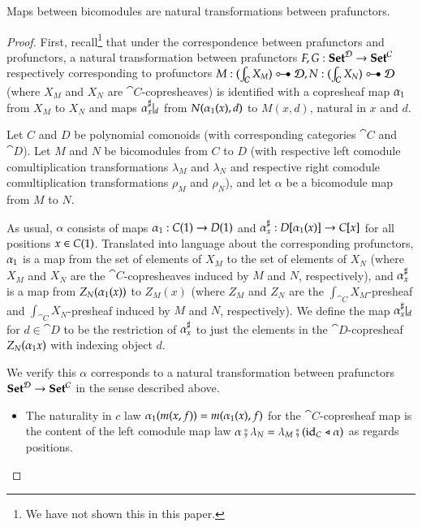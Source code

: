 \documentclass{amsart}
\begin{document}
\begin{prop}
  Maps between bicomodules are natural transformations between prafunctors.
\end{prop}
\begin{proof}
  First, recall\footnote{We have not shown this in this paper.} that
  under the correspondence between prafunctors and profunctors, a
  natural transformation between prafunctors
  $F, G: {\normalfont\mathbf{Set}}^{\mathcal{D}} \to {\normalfont\mathbf{Set}}^{\mathcal{C}}$ respectively corresponding
  to profunctors
  $M : (\int_{\cat{C}} X_M) \prof \cat{D}, N : (\int_{\cat{C}} X_N)
  \prof \cat{D}$ (where $X_M$ and $X_N$ are $\cat{C}$-copresheaves) is
  identified with a copresheaf map ${\alpha}_1$ from $X_M$ to
  $X_N$ and maps ${\alpha}^\sharp_{x}|_{d}$ from
  $N({\alpha}_1(x), d)$ to $M(x, d)$, natural in $x$ and $d$.

  Let $C$ and $D$ be polynomial comonoids (with corresponding
  categories $\cat{C}$ and $\cat{D}$). Let $M$ and $N$ be bicomodules
  from $C$ to $D$ (with respective left comodule comultiplication
  transformations $\lambda_M$ and $\lambda_N$ and respective right
  comodule comultiplication transformations $\rho_M$ and $\rho_N$),
  and let $\alpha$ be a bicomodule map from $M$ to $N$.

  As usual, $\alpha$ consists of maps
  ${\alpha}_1: C(1) \to D(1)$ and
  ${\alpha}^\sharp_{x}: D[{\alpha}_1(x)] \to C[x]$
  for all positions $x \in C(1)$. Translated into language about
  the corresponding profunctors, ${\alpha}_1$ is a map from the
  set of elements of $X_M$ to the set of elements of $X_N$ (where
  $X_M$ and $X_N$ are the $\cat{C}$-copresheaves induced by $M$ and
  $N$, respectively), and ${\alpha}^\sharp_{x}$ is a map from
  $Z_N({\alpha}_1(x))$ to $Z_M(x)$ (where $Z_M$ and $Z_N$ are
  the $\int_{\cat{C}}X_M$-presheaf and $\int_{\cat{C}}X_N$-presheaf
  induced by $M$ and $N$, respectively). We define the map
  ${\alpha}^\sharp_{x}|_{d}$ for $d \in \cat{D}$ to be the
  restriction of ${\alpha}^\sharp_{x}$ to just the elements in the
  $\cat{D}$-copresheaf $Z_N({\alpha}_1{x})$ with indexing object
  $d$.

  We verify this $\alpha$ corresponds to a natural transformation
  between prafunctors ${\normalfont\mathbf{Set}}^{\mathcal{D}} \to {\normalfont\mathbf{Set}}^{\mathcal{C}}$ in the sense
  described above.
  \begin{itemize}
  \item The naturality in $c$ law
    ${\alpha}_1(m(x,f)) = m({\alpha}_1(x),f)$ for the
    $\cat{C}$-copresheaf map is the content of the left comodule map
    law
    $\alpha \fatsemi \lambda_N = \lambda_M \fatsemi (\mathrm{id}_C \mathrel{\triangleleft}
    \alpha)$ as regards positions.
    

\end{itemize}
\end{proof}
\end{document}
